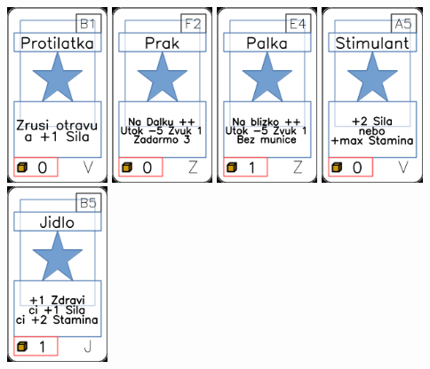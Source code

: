 \documentclass[a4paper]{article}
\begin{document}
	\includegraphics[width=3.0cm]{img-1_65}
	\includegraphics[width=3.0cm]{img-1_86}
	\includegraphics[width=3.0cm]{img-1_83}
	\includegraphics[width=3.0cm]{img-1_64}
	\includegraphics[width=3.0cm]{img-1_9}
\end{document}
